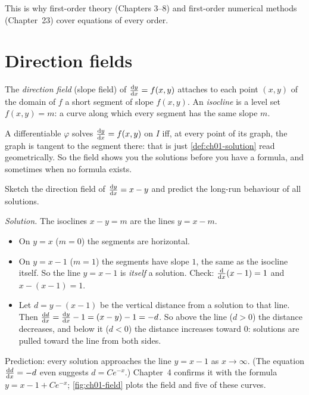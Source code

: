 This is why first-order theory (Chapters 3--8) and first-order numerical
methods (Chapter~23) cover equations of every order.

\section{Direction fields}\label{sec:ch01-direction-fields}

\begin{definition}\label{def:ch01-field}
The \emph{direction field} (slope field) of $\frac{\mathrm{d}y}{\mathrm{d}x} = f(x,y)$ attaches to
each point $(x,y)$ of the domain of $f$ a short segment of slope $f(x,y)$. An
\emph{isocline} is a level set $f(x,y) = m$: a curve along which every segment
has the same slope $m$.
\end{definition}

A differentiable $\varphi$ solves $\frac{\mathrm{d}y}{\mathrm{d}x} = f(x,y)$ on $I$ iff, at every
point of its graph, the graph is tangent to the segment there: that is just
\cref{def:ch01-solution} read geometrically. So the field shows you the
solutions before you have a formula, and sometimes when no formula exists.

\begin{example}\label{ex:ch01-field}
Sketch the direction field of $\frac{\mathrm{d}y}{\mathrm{d}x} = x - y$ and predict the long-run
behaviour of all solutions.

\emph{Solution.} The isoclines $x - y = m$ are the lines $y = x - m$.
\begin{itemize}
  \item On $y = x$ ($m = 0$) the segments are horizontal.
  \item On $y = x - 1$ ($m=1$) the segments have slope $1$, the same as the
        isocline itself. So the line $y = x - 1$ is \emph{itself} a solution.
        Check: $\frac{\mathrm{d}}{\mathrm{d}x}(x-1) = 1$ and $x - (x-1) = 1$. \checkmark
  \item Let $d = y - (x-1)$ be the vertical distance from a solution to that
        line. Then $\frac{\mathrm{d}d}{\mathrm{d}x} = \frac{\mathrm{d}y}{\mathrm{d}x} - 1 = (x - y) - 1 = -d$. So above
        the line ($d>0$) the distance decreases, and below it ($d<0$) the
        distance increases toward $0$: solutions are pulled toward the line
        from both sides.
\end{itemize}
Prediction: every solution approaches the line $y = x - 1$ as
$x\to\infty$. (The equation $\frac{\mathrm{d}d}{\mathrm{d}x} = -d$ even suggests $d = Ce^{-x}$.) Chapter~4 confirms it with the formula
$y = x - 1 + Ce^{-x}$; \cref{fig:ch01-field} plots the field and five of
these curves.
\end{example}


